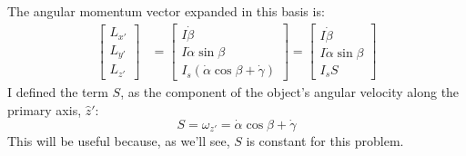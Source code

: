 \documentclass[10pt]{article}
\begin{document}
The angular momentum vector expanded in this basis is:
\begin{align}
    \begin{bmatrix}
        L_{x'} \\
        L_{y'} \\
        L_{z'}
    \end{bmatrix}
    &= 
    \begin{bmatrix}
        I\dot\beta \\
        I\dot\alpha\sin\beta \\
        I_s(\dot\alpha\cos\beta+\dot\gamma)
    \end{bmatrix}
    =
    \begin{bmatrix}
        I\dot\beta \\
        I\dot\alpha\sin\beta \\
        I_sS
    \end{bmatrix}
\end{align}
I defined the term $S$, as the component of the object's 
angular velocity along the primary axis, $\hat{z}'$:
\begin{equation}
    S = \omega_{z'}=\dot\alpha\cos\beta+\dot\gamma
\end{equation}
This will be useful because, as we'll see, $S$ is constant for this 
problem.
\end{document}
